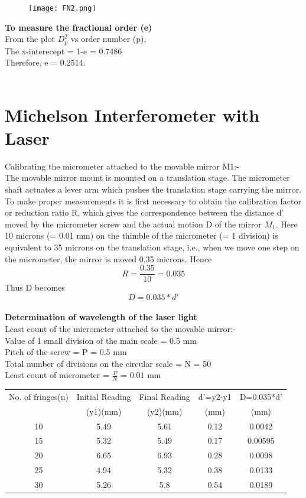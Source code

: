 \documentclass[12pt]{report}
\begin{document}
	\begin{figure}[h]
		\centering
		\texttt{[image: FN2.png]}
	\end{figure}
	\textbf{To measure the fractional order (e)}\\
	From the plot $D_p^2$ vs order number (p),\\
	The x-interecept = 1-e = 0.7486\\
	Therefore, e = 0.2514.\\ \\
	
	\newpage
	\section{Michelson Interferometer with Laser}
	Calibrating the micrometer attached to the movable mirror M1:-\\
	The movable mirror mount is mounted on a translation stage. The micrometer shaft actuates a lever arm which pushes the translation stage carrying the mirror. To make proper measurements it is first necessary to obtain the calibration factor or reduction ratio R, which gives the correspondence between the distance d’ moved by the micrometer screw and the actual motion D of the mirror $M_1$.
	Here 10 microns (= 0.01 mm) on the thimble of the micrometer (= 1 division) is
	equivalent to 35 microns on the translation stage, i.e., when we move one step on the micrometer, the mirror is moved 0.35 microns. Hence 
	$$ R = \frac{0.35}{10} = 0.035 $$
	Thus D becomes
	$$ D = 0.035*d'$$\\
	\textbf{Determination of wavelength of the laser light}\\
	Least count of the micrometer attached to the movable mirror:-\\
	Value of 1 small division of the main scale = 0.5 mm\\
	Pitch of the screw = P = 0.5 mm\\
	Total number of divisions on the circular scale = N = 50\\
	Least count of micrometer = $\frac{P}{N}$ = 0.01 mm\\
	\begin{center}
		\begin{tabular}{|c|c|c|c|c|}
			\hline
			No. of fringes(n) & Initial Reading & Final Reading & d'=y2-y1 & D=0.035*d'\\
			& (y1)(mm) & (y2)(mm) & (mm)   & (mm)   \\ \hline
			10                & 5.49            & 5.61          & 0.12 & 0.0042  \\
			15                & 5.32            & 5.49          & 0.17 & 0.00595 \\
			20                & 6.65            & 6.93          & 0.28 & 0.0098  \\
			25                & 4.94            & 5.32          & 0.38 & 0.0133  \\
			30                & 5.26            & 5.8           & 0.54 & 0.0189 \\ \hline
		\end{tabular}
	\end{center}
\end{document}
